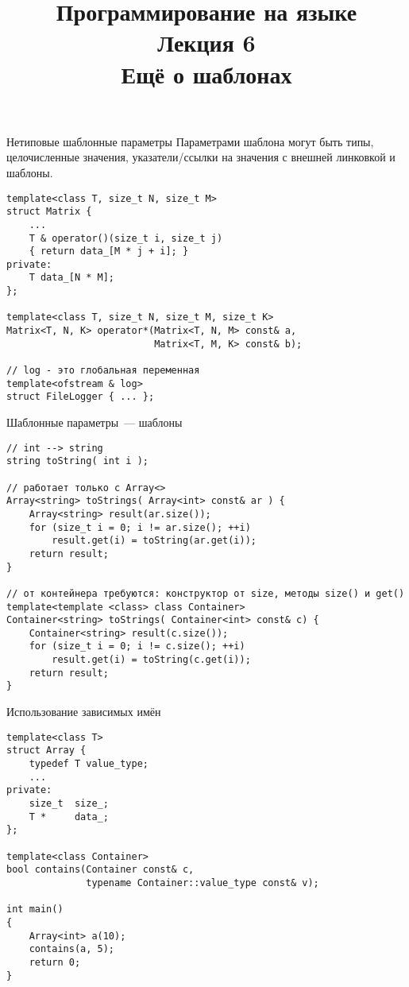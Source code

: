 \documentclass{beamer}
\title{{\bf Программирование на языке \langcpp\protect\\Лекция
6\protect\vspace{1em}\\}Ещё о шаблонах}
\begin{document}
\begin{frame} 
  \titlepage
\end{frame}

\begin{frame}[fragile]{Нетиповые шаблонные параметры}
\small
Параметрами шаблона могут быть типы, целочисленные значения, 
указатели/ссылки на значения с внешней линковкой и шаблоны.
    \begin{lstlisting}
template<class T, size_t N, size_t M>
struct Matrix {
    ...
    T & operator()(size_t i, size_t j) 
    { return data_[M * j + i]; }
private:
    T data_[N * M];
};

template<class T, size_t N, size_t M, size_t K>
Matrix<T, N, K> operator*(Matrix<T, N, M> const& a, 
                          Matrix<T, M, K> const& b);

// log - это глобальная переменная
template<ofstream & log>
struct FileLogger { ... };
    \end{lstlisting}
\end{frame}

\begin{frame}[fragile]{Шаблонные параметры~--- шаблоны}
\small
    \begin{lstlisting}
// int --> string
string toString( int i );

// работает только с Array<>
Array<string> toStrings( Array<int> const& ar ) {
    Array<string> result(ar.size());
    for (size_t i = 0; i != ar.size(); ++i)
        result.get(i) = toString(ar.get(i));
    return result;
}

// от контейнера требуются: конструктор от size, методы size() и get()
template<template <class> class Container>
Container<string> toStrings( Container<int> const& c) {
    Container<string> result(c.size());
    for (size_t i = 0; i != c.size(); ++i)
        result.get(i) = toString(c.get(i));
    return result;
}
    \end{lstlisting}
\end{frame}

\begin{frame}[fragile]{Использование зависимых имён}
\small
    \begin{lstlisting}
template<class T>
struct Array {
    typedef T value_type;
    ...
private:
    size_t  size_;
    T *     data_;
};

template<class Container>
bool contains(Container const& c, 
              typename Container::value_type const& v);

int main()
{
    Array<int> a(10);
    contains(a, 5);
    return 0;
}

    \end{lstlisting}
\end{frame}
\end{document}
